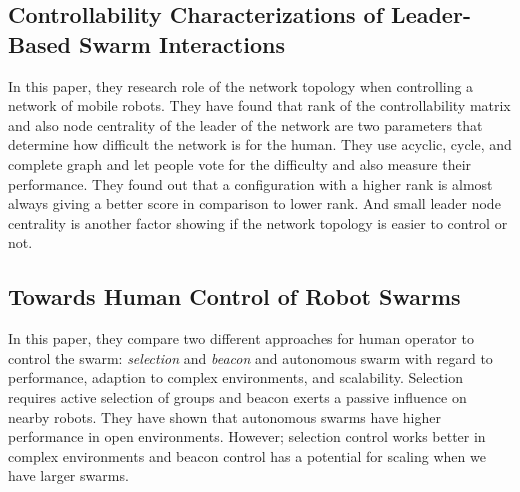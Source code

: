 \documentclass[letterpaper, 10 pt, conference]{ieeeconf}
\begin{document}
\subsection{Controllability Characterizations of Leader-Based Swarm Interactions}

In this paper, they research role of the network topology when controlling a network of mobile robots. They have found that rank of the controllability matrix and also node centrality of the leader of the network are two parameters that determine how difficult the network is for the human. They use acyclic, cycle, and complete graph and let people vote for the difficulty and also measure their performance. They found out that a configuration with a higher rank is almost always giving a better score in comparison to lower rank. And small leader node centrality is another factor showing if the network topology is easier to control or not. \cite{Croix2012}

\subsection{Towards Human Control of Robot Swarms}

In this paper, they compare two different approaches for human operator to control the swarm: \emph{selection} and \emph{beacon} and autonomous swarm with regard to performance, adaption to complex environments, and scalability. Selection requires active selection of groups and beacon exerts a passive influence on nearby robots. They have shown that autonomous swarms have higher performance in open environments. However; selection control works better in complex environments and beacon control has a potential for scaling when we have larger swarms. \cite{Lewis2012}
 


\end{document}
